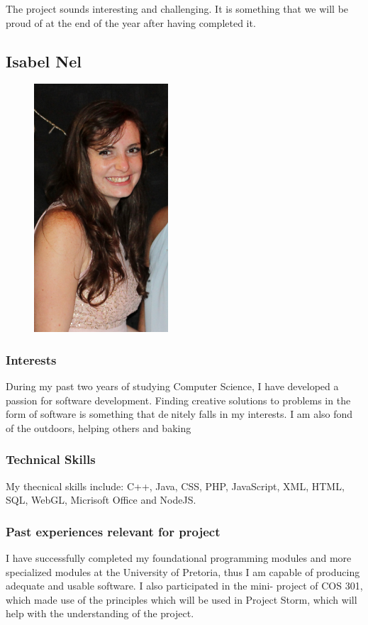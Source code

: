 \documentclass[hidelinks, 12pt, oneside]{article}
\begin{document}
The project sounds interesting and challenging. It is something that we will be proud of at the end of the year after having completed it.

\subsection{Isabel Nel}

\begin{figure}[ht!]
\centering
\includegraphics[width=50mm]{IsabelNel}
\end{figure}

\subsubsection{Interests}
During my past two years of studying Computer Science, I have developed a
passion for software development. Finding creative solutions to problems in
the form of software is something that denitely falls in my interests. I am
also fond of the outdoors, helping others and baking

\subsubsection{Technical Skills}
My thecnical skills include: C++, Java, CSS, PHP, JavaScript, XML, HTML,
SQL, WebGL, Micrisoft Office and NodeJS.

\subsubsection{Past experiences relevant for project}
I have successfully completed my foundational programming modules and
more specialized modules at the University of Pretoria, thus I am capable
of producing adequate and usable software. I also participated in the mini-
project of COS 301, which made use of the principles which will be used in
Project Storm, which will help with the understanding of the project.
\end{document}

